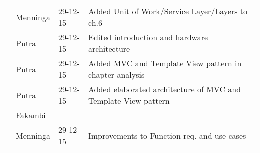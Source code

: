 \begin{longtable}{L{} L{} L{} L{}}
					& Menninga  & 29-12-15 & Added Unit of Work/Service Layer/Layers to ch.6 \\
					& Putra		& 29-12-15 & Edited introduction and hardware architecture \\
					& Putra		& 29-12-15 & Added MVC and Template View pattern in chapter analysis\\
					& Putra		& 29-12-15 & Added elaborated architecture of MVC and Template View pattern\\
					& Fakambi   & & \\
					& Menninga  & 29-12-15 & Improvements to Function req. and use cases\\
	\bottomrule
\end{longtable}